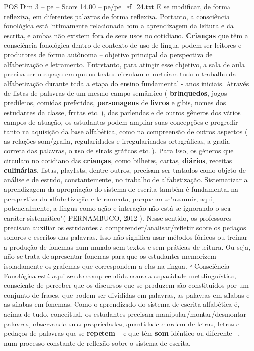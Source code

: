 \begin{textsample}{POS Dim 3 – pe – Score 14.00 – pe/pe\_ef\_24.txt}
E se modificar, de forma reflexiva, em diferentes palavras de forma reflexiva.
Portanto, a consciência fonológica está intimamente relacionada com a aprendizagem da leitura e da escrita, e ambas não existem fora de seus usos no cotidiano. \textbf{Crianças} que têm a consciência fonológica dentro de contexto de uso de língua podem ser leitores e produtores de forma autônoma – objetivo principal da perspectiva de alfabetização e letramento.
Entretanto, para atingir esse objetivo, a sala de aula precisa ser o espaço em que os textos circulam e norteiam todo o trabalho da alfabetização durante toda a etapa do ensino fundamental - anos iniciais.
Através de listas de palavras de um mesmo campo semântico ( \textbf{brinquedos}, jogos prediletos, comidas preferidas, \textbf{personagens} de \textbf{livros} e gibis, nomes dos estudantes da classe, frutas etc. ), das parlendas e de outros gêneros dos vários campos de atuação, os estudantes podem ampliar suas concepções e progredir tanto na aquisição da base alfabética, como na compreensão de outros aspectos ( as relações som/grafia, regularidades e irregularidades ortográficas, a grafia correta das palavras, o uso de sinais gráficos etc. ).
Para isso, os gêneros que circulam no cotidiano das \textbf{crianças}, como bilhetes, cartas, \textbf{diários}, receitas \textbf{culinárias}, listas, playlists, dentre outros, precisam ser tratados como objeto de análise e de estudo, constantemente, no trabalho de alfabetização.
Sistematizar a aprendizagem da apropriação do sistema de escrita também é fundamental na perspectiva da alfabetização e letramento, porque ao se"assumir, aqui, potencialmente, a língua como ação e interação não está se ignorando o seu caráter sistemático"( PERNAMBUCO, 2012 ).
Nesse sentido, os professores precisam auxiliar os estudantes a compreender/analisar/refletir sobre os pedaços sonoros e escritos das palavras.
Isso não significa usar métodos fônicos ou treinar a produção de fonemas num mundo sem textos e sem práticas de leitura.
Ou seja, não se trata de apresentar fonemas para que os estudantes memorizem isoladamente os grafemas que correspondem a eles na língua. ⁵ Consciência Fonológica está aqui sendo compreendida como a capacidade metalinguística, consciente de perceber que os discursos que se produzem são constituídos por um conjunto de frases, que podem ser divididas em palavras, as palavras em sílabas e as sílabas em fonemas.
Como o aprendizado do sistema de escrita alfabética é, acima de tudo, conceitual, os estudantes precisam manipular/montar/desmontar palavras, observando suas propriedades, quantidade e ordem de letras, letras e pedaços de palavras que se \textbf{repetem} – e que têm \textbf{som} idêntico ou diferente –, num processo constante de reflexão sobre o sistema de escrita.

\end{textsample}
